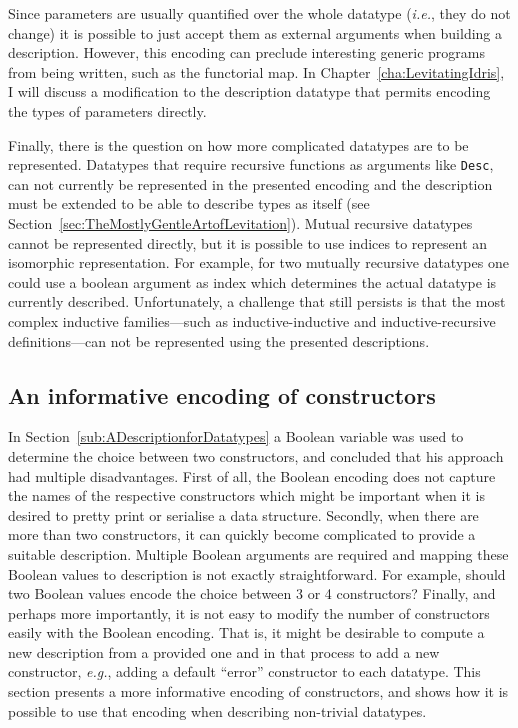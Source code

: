 \documentclass{ituthesis}
\newcommand{\tttype}[1]{\textcolor{type-color}{\texttt{#1}}}
\theoremstyle{break}
\begin{document}
Since parameters are usually quantified over the whole datatype (\textit{i.e.}, they do not change) it is possible to just accept them as external arguments when building
a description.
However, this encoding can preclude interesting generic programs from being written, such as the functorial map. In Chapter~\ref{cha:LevitatingIdris}, I will discuss a modification to the description datatype that permits encoding the types of
parameters directly.

Finally, there is the question on how more complicated datatypes are to be represented.
Datatypes that require recursive functions as arguments like \tttype{Desc}, can not currently be represented in the presented encoding and the description must be extended to be able to describe types as itself (see Section~\ref{sec:TheMostlyGentleArtofLevitation}).
Mutual recursive datatypes cannot be represented directly, but it is possible to use indices to represent an isomorphic representation.
For example, for two mutually recursive datatypes one could use a boolean argument as index which determines the actual datatype is currently described.
Unfortunately, a challenge that still persists is that the most complex inductive families---such as inductive-inductive and inductive-recursive definitions---can not be represented using the presented descriptions.

\subsection{An informative encoding of constructors}
\label{sub:AnInformativeEncodingofConstructors}
In Section~\ref{sub:ADescriptionforDatatypes} a Boolean variable was used to determine the choice between two constructors, and concluded that his approach had multiple disadvantages.
First of all, the Boolean encoding does not capture the names of the respective constructors which might be important when it is desired to pretty print or serialise a data structure.
Secondly, when there are more than two constructors, it can quickly become complicated to provide a suitable description.
Multiple Boolean arguments are required and mapping these Boolean values to description is not exactly straightforward.
For example, should two Boolean values encode the choice between 3 or 4 constructors?
Finally, and perhaps more importantly, it is not easy to modify the number of constructors easily with the Boolean encoding. That is, it might be desirable to compute a new description from a provided one and in that process to add a new constructor,
\textit{e.g.}, adding a default ``error'' constructor to each datatype.
This section presents a more informative encoding of constructors, and shows how it is possible to use that encoding when describing non-trivial datatypes.
\end{document}
